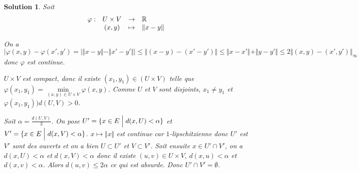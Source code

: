 \documentclass[12pt]{article}
\newtheorem{solution}{Solution}[section]
\theoremstyle{remark}
\newcommand{\function}[5]{
	$$
	\begin{array}{rccl}
		#1: & #2 & \to & #3 \\
		& #4 & \mapsto & #5
	\end{array}
	$$
}
\begin{document}
\begin{solution}
	Soit \function{\varphi}{U\times V}{\R}{(x,y)}{\Vert x-y\Vert}
	On a 
	$$\vert\varphi(x,y)-\varphi(x',y')=\vert\Vert x-y\Vert-\Vert x'-y'\Vert\vert\leqslant\Vert (x-y)-(x'-y')\Vert\leqslant\Vert x-x'\Vert+\Vert y-y'\Vert\leqslant2\Vert(x,y)-(x',y')\Vert_{\infty}$$
	donc $\varphi$ est continue.

	$U\times V$ est compact, donc il existe $(x_{1},y_{1})\in(U\times V)$ telle que $\varphi(x_{1},y_{1})=\min\limits_{(x,y)\in U\times V}\varphi(x,y)$. Comme $U$ et $V$ sont disjoints, $x_{1}\neq y_{1}$ et $\varphi(x_{1},y_{1}))d(U,V)>0$.

	Soit $\alpha=\frac{d(U,V)}{3}$. On pose $U'=\{x\in E\Bigm|d(x,U)<\alpha\}$ et $V'=\{x\in E\Bigm|d(x,V)<\alpha\}$. $x\mapsto\Vert x\Vert$ est continue car $1$-lipschitzienne donc $U'$ est $V'$ sont des ouverts et on a bien $U\subset U'$ et $V\subset V'$. Soit ensuite $x\in U'\cap V'$, on a $d(x,U)<\alpha$ et $d(x,V)<\alpha$ donc il existe $(u,v)\in U\times V$, $d(x,u)<\alpha$ et $d(x,v)<\alpha$. Alors $d(u,v)\leqslant2\alpha$ ce qui est absurde. Donc $U'\cap V'=\emptyset$.
\end{solution}
\end{document}
